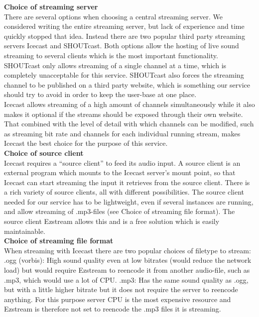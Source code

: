 \documentclass[a4paper,11pt,report]{article}
\begin{document}
\textbf{Choice of streaming server} \\
There are several options when choosing a central streaming server.
We considered writing the entire streaming server, but lack of experience and time quickly stopped that idea. Instead there are two popular third party streaming servers Icecast and SHOUTcast. Both options allow the hosting of live sound streaming to several clients which is the most important functionality. SHOUTcast only allows streaming of a single channel at a time, which is completely unacceptable for this service. SHOUTcast also forces the streaming channel to be published on a third party website, which is something our service should try to avoid in order to keep the user-base at one place. \\
Icecast allows streaming of a high amount of channels simultaneously while it also makes it optional if the streams should be exposed through their own website. That combined with the level of detail with which channels can be modified, such as streaming bit rate and channels for each individual running stream, makes Icecast the best choice for the purpose of this service. \\

\textbf{Choice of source client} \\
Icecast requires a “source client” to feed its audio input. A source client is an external program which mounts to the Icecast server’s mount point, so that Icecast can start streaming the input it retrieves from the source client. There is a rich variety of source clients, all with different possibilities. The source client needed for our service has to be lightweight, even if several instances are running, and allow streaming of .mp3-files (see Choice of streaming file format). The source client Ezstream allows this and is a free solution which is easily maintainable. \\

\textbf{Choice of streaming file format} \\
When streaming with Icecast there are two popular choices of filetype to stream:
.ogg (vorbis): High sound quality even at low bitrates (would reduce the network load) but would require Ezstream to reencode it from another audio-file, such as .mp3, which would use a lot of CPU.
.mp3: Has the same sound quality as .ogg, but with a little higher bitrate but it does not require the server to reencode anything.
For this purpose server CPU is the most expensive resource and Ezstream is therefore not set to reencode the .mp3 files it is streaming.
\end{document}
